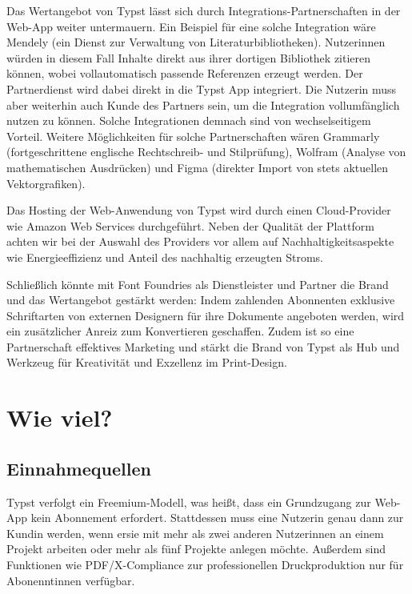 \documentclass[11pt, a4paper]{article}
\newcommand{\gender}{\raisebox{-.25em}{*}}
\let\oldsection\section
\renewcommand\section{\clearpage\oldsection}
\renewcommand{\glossary} {\marginsymbol{$\hookrightarrow$}}
\newcommand{\marginsymbol}[1] {\protect\marginsymbolhelper{#1}}
\newcommand{\marginsymbolhelper}[1] {\tabto*{-1cm}\makebox[0cm]{#1}\tabto*{\TabPrevPos}}
\begin{document}
Das Wertangebot von Typst lässt sich durch Integrations-Partnerschaften in der Web-App weiter untermauern. Ein Beispiel für eine solche Integration wäre Mendely (ein Dienst zur Verwaltung von Literaturbibliotheken). Nutzer\gender{}innen würden in diesem Fall Inhalte direkt aus ihrer dortigen Bibliothek zitieren können, wobei vollautomatisch passende Referenzen erzeugt werden. Der Partnerdienst wird dabei direkt in die Typst App integriert. Die\gender{} Nutzer\gender{}in muss aber weiterhin auch Kunde des Partners sein, um die Integration vollumfänglich nutzen zu können. Solche Integrationen demnach sind von wechselseitigem Vorteil. Weitere Möglichkeiten für solche Partnerschaften wären Grammarly (fortgeschrittene englische Rechtschreib- und Stilprüfung), Wolfram (Analyse von mathematischen Ausdrücken) und Figma (direkter Import von stets aktuellen Vektorgrafiken).

Das Hosting der Web-Anwendung von Typst wird durch einen Cloud-Provider wie Amazon Web Services durchgeführt. Neben der Qualität der Plattform achten wir bei der Auswahl des Providers vor allem auf Nachhaltigkeitsaspekte wie Energieeffizienz und Anteil des nachhaltig erzeugten Stroms.

Schließlich könnte mit Font Foundries als Dienstleister und Partner die Brand und das Wertangebot gestärkt werden: Indem zahlenden Abonnenten exklusive Schriftarten von externen Designern für ihre Dokumente angeboten werden, wird ein zusätzlicher Anreiz zum Konvertieren geschaffen. Zudem ist so eine Partnerschaft effektives Marketing und stärkt die Brand von Typst als Hub und Werkzeug für Kreativität und Exzellenz im Print-Design.

\section*{Wie viel?}
\subsection*{Einnahmequellen}


Typst verfolgt ein Freemium-Modell, was heißt, dass ein Grundzugang zur Web-App kein Abonnement erfordert. Stattdessen muss ein\gender{}e Nutzer\gender{}in genau dann zur Kund\gender{}in werden, wenn er\gender{}sie mit mehr als zwei anderen Nutzer\gender{}innen an einem Projekt arbeiten oder mehr als fünf Projekte anlegen möchte. Außerdem sind Funktionen wie \glossary PDF/X-Compliance zur professionellen Druckproduktion nur für Abonennt\gender{}innen verfügbar.
\end{document}
